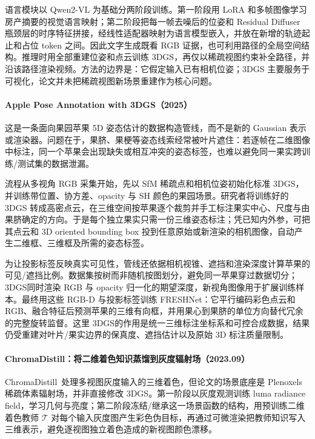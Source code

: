 语言模块以 Qwen2-VL 为基础分两阶段训练。第一阶段用 LoRA 和多帧图像学习房产摘要的视觉语言映射；第二阶段把每一帧去噪后的位姿和 Residual Diffuser 瓶颈层的时序特征拼接，经线性适配器映射为语言模型嵌入，并放在新增的轨迹起止和占位 token 之间。因此文字生成既看 RGB 证据，也可利用路径的全局空间结构。推理时用全部重建位姿和点云训练 3DGS，再仅以稀疏视图约束补全路径，并沿该路径渲染视频。方法的边界是：它假定输入已有相机位姿；3DGS 主要服务于可视化，论文并未把稀疏视图新场景重建作为核心问题。

\paragraph{Apple Pose Annotation with 3DGS（2025）\cite{2512_20148}}
这是一条面向果园苹果 5D 姿态估计的数据构造管线，而不是新的 Gaussian 表示或渲染器。问题在于，果脐、果梗等姿态线索经常被叶片遮住：若逐帧在二维图像中标注，同一个苹果会出现缺失或相互冲突的姿态标签，也难以避免同一果实跨训练/测试集的数据泄漏。

流程从多视角 RGB 采集开始，先以 SfM 稀疏点和相机位姿初始化标准 3DGS，并训练带位置、协方差、opacity 与 SH 颜色的果园场景。研究者将训练好的 3DGS 转成高密点云，在三维空间按苹果逐个裁剪并手工标注果实中心、尺度与由果脐确定的方向。于是每个独立果实只需一份三维姿态标注；凭已知内外参，可把其点云和 3D oriented bounding box 投到任意原始或新渲染的相机图像，自动产生二维框、三维框及所需的姿态标签。

为让投影标签反映真实可见性，管线还依据相机视锥、遮挡和渲染深度计算苹果的可见/遮挡比例。数据集按树而非随机按图划分，避免同一苹果穿过数据切分；3DGS同时渲染 RGB 与 opacity 归一化的期望深度，新视角图像用于扩展训练样本。最终用这些 RGB-D 与投影标签训练 FRESHNet：它平行编码彩色点云和 RGB、融合特征后预测苹果的三维有向框，并用果心到果脐的单位方向替代冗余的完整旋转监督。这里 3DGS的作用是统一三维标注坐标系和可控合成数据，结果仍受重建对叶片/果实边界的保真度、遮挡估计以及原始 3D 标注质量限制。

\paragraph{ChromaDistill：将二维着色知识蒸馏到灰度辐射场（2023.09）}
ChromaDistill~\cite{2309_07668}处理多视图灰度输入的三维着色，但论文的场景底座是 Plenoxels 稀疏体素辐射场，并非直接修改 3DGS。第一阶段以灰度观测训练 luma radiance field，学习几何与亮度；第二阶段冻结/继承这一场景函数的结构，用预训练二维着色教师 $\mathcal T$ 对每个输入灰度图产生彩色伪目标，再通过可微渲染把教师知识写入三维表示，避免逐视图独立着色造成的新视图颜色漂移。

